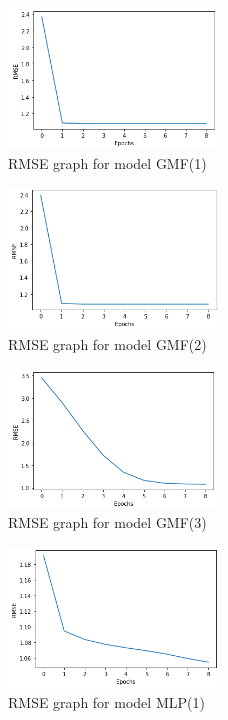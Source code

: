 \documentclass[final]{cvpr}
\begin{document}
\begin{figure}
	\includegraphics[width=0.5\textwidth]{screenshot20210415234153.png}
	\caption{RMSE graph for model GMF(1)}
\end{figure}

\begin{figure}
	\includegraphics[width=0.5\textwidth]{screenshot20210415234346.png}
	\caption{RMSE graph for model GMF(2)}
\end{figure}

\begin{figure}
	\includegraphics[width=0.5\textwidth]{screenshot20210415234450.png}
	\caption{RMSE graph for model GMF(3)}
\end{figure}

\begin{figure}
	\includegraphics[width=0.5\textwidth]{mlp_1.png}
	\caption{RMSE graph for model MLP(1)}
\end{figure}
\end{document}
